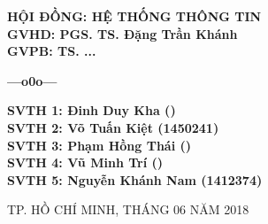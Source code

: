 \begin{titlepage}
\hspace{4.5cm}	
\begin{minipage}[t]{0.7\linewidth}
\large
	\textbf{HỘI ĐỒNG: HỆ THỐNG THÔNG TIN}\\ [0.5cm]
	\textbf{GVHD: PGS. TS. Đặng Trần Khánh}\\ [0.5cm]
	\textbf{GVPB: TS. ...}\\
	\vspace{-0.7cm}
	\begin{center}
	\textbf{---o0o---}
	\end{center}
	\textbf{SVTH 1: Đinh Duy Kha ()}\\ [0.5cm]
	\textbf{SVTH 2: Võ Tuấn Kiệt (1450241)}\\[0.5cm]
	\textbf{SVTH 3: Phạm Hồng Thái ()}\\[0.5cm]
	\textbf{SVTH 4: Vũ Minh Trí ()}\\[0.5cm]
	\textbf{SVTH 5: Nguyễn Khánh Nam (1412374)}\\[0.5cm]
\end{minipage}

\vfill
\centerline{\large{TP. HỒ CHÍ MINH, THÁNG 06 NĂM 2018}}
\end{titlepage}
